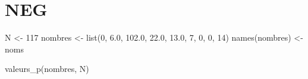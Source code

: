 \documentclass[
]{article}
\newenvironment{Shaded}{\begin{snugshade}}{\end{snugshade}}
\newcommand{\DecValTok}[1]{\textcolor[rgb]{0.00,0.00,0.81}{#1}}
\newcommand{\FloatTok}[1]{\textcolor[rgb]{0.00,0.00,0.81}{#1}}
\newcommand{\FunctionTok}[1]{\textcolor[rgb]{0.00,0.00,0.00}{#1}}
\newcommand{\NormalTok}[1]{#1}
\newcommand{\OtherTok}[1]{\textcolor[rgb]{0.56,0.35,0.01}{#1}}
\begin{document}
\hypertarget{neg}{%
\section{NEG}\label{neg}}

\begin{Shaded}
\begin{Highlighting}[]
\NormalTok{N }\OtherTok{\textless{}{-}} \DecValTok{117}
\NormalTok{nombres }\OtherTok{\textless{}{-}} \FunctionTok{list}\NormalTok{(}\DecValTok{0}\NormalTok{, }\FloatTok{6.0}\NormalTok{, }\FloatTok{102.0}\NormalTok{,   }\FloatTok{22.0}\NormalTok{, }\FloatTok{13.0}\NormalTok{, }\DecValTok{7}\NormalTok{,   }\DecValTok{0}\NormalTok{, }\DecValTok{0}\NormalTok{, }\DecValTok{14}\NormalTok{)}
\FunctionTok{names}\NormalTok{(nombres) }\OtherTok{\textless{}{-}}\NormalTok{ noms}

\FunctionTok{valeurs\_p}\NormalTok{(nombres, N)}
\end{Highlighting}
\end{Shaded}
\end{document}
